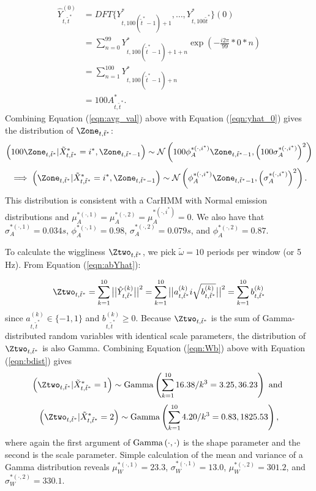 \begin{align}
    \hat{Y}^{(0)}_{t,\tilde t^*} &=
    DFT\{Y^*_{t,100(\tilde t^* - 1) + 1},\ldots,Y^*_{t,100\tilde t^*}\}(0) \nonumber \\
    &= \sum_{n=0}^{99} Y^*_{t,100(\tilde t^* - 1) + 1 + n} \exp\left(-\frac{i2\pi}{99}*0*n\right) \nonumber \\
    &= \sum_{n=1}^{100} Y^*_{t,100(\tilde t^* - 1) + n} \nonumber \\
    &= 100A^*_{t,\tilde t^*}.
    \label{eqn:avg_val}
\end{align}
%
Combining Equation (\ref{eqn:avg_val}) above with Equation (\ref{eqn:yhat_0}) gives the distribution of $\Zone_{t,\tilde t^*}$: 
%
\[\left(100\Zone_{t,\tilde t^*} | \tilde X^*_{t,\tilde t^*} = i^*, \Zone_{t,\tilde t^*-1} \right) \sim \mathcal{N} \left(100\phi_A^{*(\cdot,i^*)} \Zone_{t,\tilde t^*-1}, \left(100\sigma_A^{*(\cdot,i^*)}\right)^2 \right)\]
%
\[\implies \left(\Zone_{t,\tilde t^*} | \tilde X^*_{t,\tilde t^*} = i^*, \Zone_{t,\tilde t^*-1} \right) \sim \mathcal{N} \left(\phi_A^{*(\cdot,i^*)} \Zone_{t,\tilde t^*-1}, \left(\sigma_A^{*(\cdot,i^*)}\right)^2 \right).\]
%
This distribution is consistent with a CarHMM with Normal emission distributions and $\mu_A^{*(\cdot,1)} = \mu_A^{*(\cdot,2)} = \mu_A^{*(\cdot,i^*)} = 0$. We also have that $\sigma_A^{*(\cdot,1)} = 0.034s$, $\phi_A^{*(\cdot,1)} = 0.98$, $\sigma_A^{*(\cdot,2)} = 0.079s$, and $\phi_A^{*(\cdot,2)} = 0.87$.

To calculate the wiggliness $\Ztwo_{t,\tilde t^*}$, we pick $\tilde{\omega} = 10$ periods per window (or 5 Hz). From Equation (\ref{eqn:abYhat}):

\begin{equation}
    \Ztwo_{t,\tilde t^*} = \sum_{k=1}^{10} \big|\big|\hat{Y}^{(k)}_{t,\tilde t^*}\big|\big|^2 = \sum_{k=1}^{10} \big|\big|a^{(k)}_{t,\tilde t^*}i\sqrt{b^{(k)}_{t,\tilde t^*}}\big|\big|^2 = \sum_{k=1}^{10} b^{(k)}_{t,\tilde t^*}
    \label{eqn:Wb}
\end{equation}
%
since $a^{(k)}_{t,\tilde t^*} \in \{-1,1\}$ and $b^{(k)}_{t,\tilde t^*} \geq 0$. Because $\Ztwo_{t,\tilde t^*}$ is the sum of Gamma-distributed random variables with identical scale parameters, the distribution of $\Ztwo_{t,\tilde t^*}$ is also Gamma. Combining Equation (\ref{eqn:Wb}) above with Equation (\ref{eqn:bdist}) gives
%
\[\left(\Ztwo_{t,\tilde t^*}|\tilde X^*_{t,\tilde t^*} = 1\right) \sim {\rm{Gamma}}\left(\sum_{k=1}^{10} 16.38/k^3 = 3.25 , 36.23 \right) \text { and }\]
%
\[\left(\Ztwo_{t,\tilde t^*}|\tilde X^*_{t,\tilde t^*} = 2\right) \sim {\rm{Gamma}}\left(\sum_{k=1}^{10} 4.20/k^3 = 0.83 , 1825.53 \right),\]
%
where again the first argument of ${\rm{Gamma}}\left(\cdot,\cdot\right)$ is the shape parameter and the second is the scale parameter. Simple calculation of the mean and variance of a Gamma distribution reveals $\mu_W^{*(\cdot,1)} = 23.3$, $\sigma_W^{*(\cdot,1)} = 13.0$, $\mu_W^{*(\cdot,2)} = 301.2$, and $\sigma_W^{*(\cdot,2)} = 330.1$.

